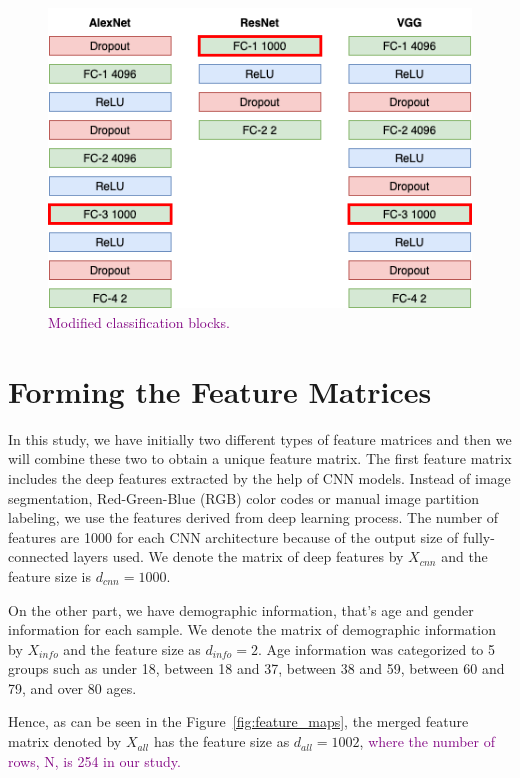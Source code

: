 \begin{figure}[h]
	\centering
	\includegraphics[width=.8\linewidth]{fig/modified_classification_blocks.png}
	\vspace{2mm}
	\caption{\textcolor{purple}{Modified classification blocks.}}
	\label{fig:modified_classification_blocks}
\end{figure}

\section{Forming the Feature Matrices} \label{sec:CH5_forming_features}

In this study, we have initially two different types of feature matrices and then we will combine these two to obtain a unique feature matrix. The first feature matrix includes the deep features extracted by the help of CNN models. Instead of image segmentation, Red-Green-Blue (RGB) color codes or manual image partition labeling, we use the features derived from deep learning process. The number of features are 1000 for each CNN architecture because of the output size of fully-connected layers used. We denote the matrix of deep features by $X_{cnn}$ and the feature size is $d_{cnn} = 1000$.

On the other part, we have demographic information, that's age and gender information for each sample. We denote the matrix of demographic information by $X_{info}$ and the feature size as $d_{info} = 2$. Age information was categorized to 5 groups such as under 18, between 18 and 37, between 38 and 59, between 60 and 79, and over 80 ages.

Hence, as can be seen in the Figure~\ref{fig:feature_maps}, the merged feature matrix denoted by $X_{all}$ has the feature size as $d_{all} = 1002$, \textcolor{purple}{where the number of rows, N, is 254 in our study.}

